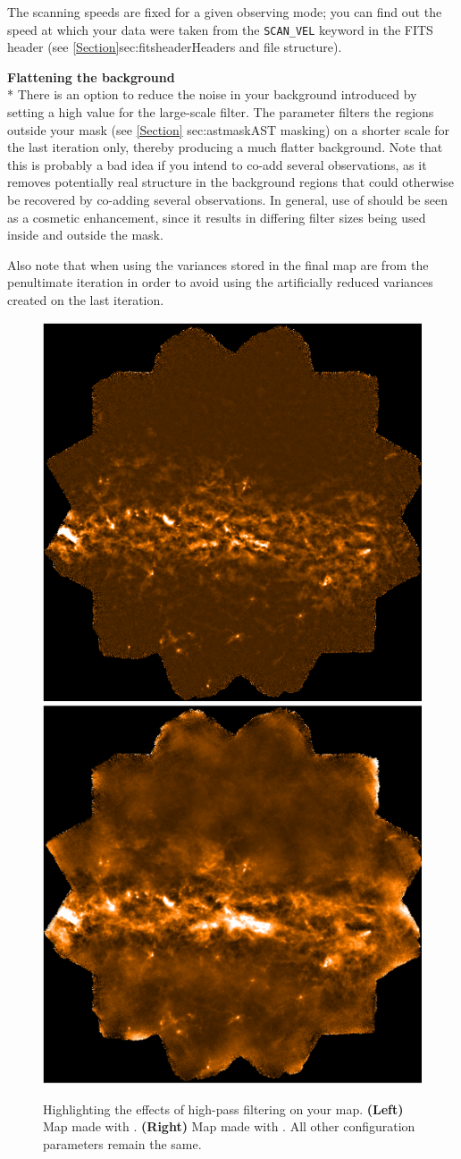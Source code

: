 The scanning speeds are fixed for a given observing mode; you can find
out the speed at which your data were taken from the
\texttt{SCAN\_VEL} keyword in the FITS header (see
\cref{Section}{sec:fitsheader}{Headers and file structure}).

\textbf{Flattening the background}\\*
There is an option to reduce the noise in your background introduced by
setting a high value for the large-scale filter. The parameter
filters the regions outside your  mask (see \cref{Section}
{sec:astmask}{AST masking}) on a shorter scale for the last iteration only,
thereby producing a much flatter background. Note that this is probably a
bad idea if you intend to co-add several observations, as it removes
potentially real structure in the background regions that could otherwise be
recovered by co-adding several observations. In general, use of
 should be seen as a cosmetic
enhancement, since it results in differing filter sizes being used inside
and outside the  mask.

Also note that when using  the
variances stored in the final map are from the penultimate iteration in
order to avoid using the artificially reduced variances created on the
last iteration.

\begin{figure}
\includegraphics[width=0.46\linewidth]{sc21_brex_19}
\hspace{7mm}
\includegraphics[width=0.46\linewidth]{sc21_brex_18}
\caption[Illustrating the effects of high-pass filtering]{
  Highlighting the effects of high-pass filtering on your map.
  \textbf{(Left)} Map made with .
  \textbf{(Right)} Map made with .
  All other configuration parameters remain the same.\label{fig:fltcompare}
}
\end{figure}


